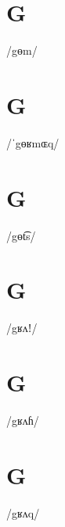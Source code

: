 \documentclass[10pt,a4paper,twoside]{book}
\begin{document}
\section*{G}

\begin{multicols}{3}
 {/gɵm/} {}
\end{multicols}

\section*{G}

\begin{multicols}{3}
 {/ˈgɵʁmɶq/} {}
\end{multicols}

\section*{G}

\begin{multicols}{3}
 {/gɵt͡s/} {}
\end{multicols}

\section*{G}

\begin{multicols}{3}
 {/gʁʌǃ/} {}
\end{multicols}

\section*{G}

\begin{multicols}{3}
 {/gʁʌɦ/} {}
\end{multicols}

\section*{G}

\begin{multicols}{3}
 {/gʁʌq/} {}
\end{multicols}
\end{document}
